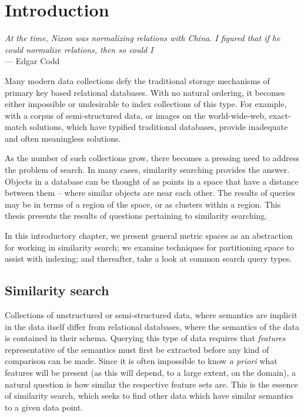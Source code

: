 \chapter{Introduction}\label{ch:introduction}
\begin{flushleft}{\slshape    
    At the time, Nixon was normalizing relations with China.  
    I figured that if he could normalize relations, then so could I} \\ \medskip
    --- Edgar Codd
\end{flushleft}
%
Many modern data collections defy the traditional storage mechanisms of primary key based relational databases. With no natural ordering, it becomes either impossible or undesirable to index collections of this type.  For example, with a corpus of semi-structured data, or images on the world-wide-web, exact-match solutions, which have typified traditional databases, provide inadequate and often meaningless solutions.

As the number of such collections grow, there becomes a pressing need to address the problem of search.  In many cases, similarity searching provides the answer. Objects in a database can be thought of as points in a space that have a distance between them -- where similar objects are near each other.  The results of queries may be in terms of a region of the space, or as clusters within a region.  This thesis presents the results of questions pertaining to similarity searching.

In this introductory chapter, we present general metric spaces as an abstraction for working in similarity search; we examine techniques for partitioning space to assist with indexing; and thereafter, take a look at common search query types.
 \section{Similarity search}
Collections of unstructured or semi-structured data, where semantics are implicit in the data itself differ from relational databases, where the semantics of the data is contained in their schema.  Querying this type of data requires that \textit{features} representative of the semantics must first be extracted before any kind of comparison can be made.  Since it is often impossible to know \textit{a priori} what features will be present (as this will depend, to a large extent, on the domain), a natural question is how similar the respective feature sets are.  This is the essence of similarity search, which seeks to find other data which have similar semantics to a given data point.

